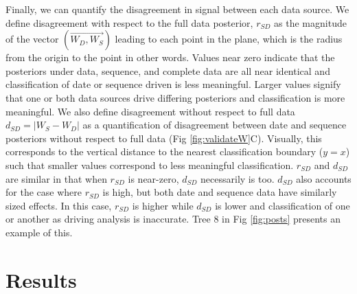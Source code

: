 \documentclass{article}
\begin{document}
Finally, we can quantify the disagreement in signal between each data source. We define disagreement with respect to the full data posterior, $r_{SD}$ as the magnitude of the vector $(\overrightarrow{W_{D}, W_{S}})$ leading to each point in the plane, which is the radius from the origin to the point in other words. Values near zero indicate that the posteriors under data, sequence, and complete data are all near identical and classification of date or sequence driven is less meaningful. Larger values signify that one or both data sources drive differing posteriors and classification is more meaningful. We also define disagreement without respect to full data $d_{SD} = | W_{S} - W_{D} |$ as a quantification of disagreement between date and sequence posteriors without respect to full data (Fig \ref{fig:validateW}C). Visually, this corresponds to the vertical distance to the nearest classification boundary ($y=x$) such that smaller values correspond to less meaningful classification. $r_{SD}$ and $d_{SD}$ are similar in that when $r_{SD}$ is near-zero,  $d_{SD}$ necessarily is too. $d_{SD}$ also accounts for the case where $r_{SD}$ is high, but both date and sequence data have similarly sized effects. In this case, $r_{SD}$ is higher while $d_{SD}$ is lower and classification of one or another as driving analysis is inaccurate. Tree 8 in Fig \ref{fig:posts} presents an example of this.

\section*{Results}


\end{document}
